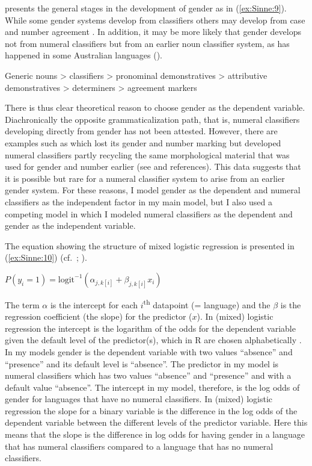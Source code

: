 \documentclass[output=collectionpaper]{langsci/langscibook}
\begin{document}
\citet[451]{Luraghi2011} presents the general stages in the development of gender as in (\ref{ex:Sinne:9}). While some gender systems develop from classifiers others may develop from case and number agreement \citep[452]{Luraghi2011}. In addition, it may be more likely that gender develops not from numeral classifiers but from an earlier noun classifier system, as has happened in some Australian languages (\citealt{Plaster2007}).

\ea
\label{ex:Sinne:9}
Generic nouns > classifiers > pronominal demonstratives > attributive demonstratives > determiners > agreement markers
\z

There is thus clear theoretical reason to choose gender as the dependent variable. Diachronically the opposite grammaticalization path, that is, numeral classifiers developing directly from gender has not been attested. However, there are examples such as  which lost its gender and number marking but developed numeral classifiers partly recycling the same morphological material that was used for gender and number earlier (see \citealt[379]{Aikhenvald2000} and references). This data suggests that it is possible but rare for a numeral classifier system to arise from an earlier gender system. For these reasons, I model gender as the dependent and numeral classifiers as the independent factor in my main model, but I also used a competing model in which I modeled numeral classifiers as the dependent and gender as the independent variable.

The equation showing the structure of mixed logistic regression is presented in (\ref{ex:Sinne:10}) (cf.\ \citealt[279]{Gelman2007}; \citealt[8]{Bentz2013}).

\ea
\label{ex:Sinne:10}
$P(y_{i}=1)={\text{logit}}^{-1}({\alpha} _{j,k[i]}+{\beta} _{j,k[i]}{x}_{i})$
\z

The term $\alpha$ is the intercept for each $i$\textsuperscript{th} datapoint (= language) and the $\beta$ is the regression coefficient (the slope) for the predictor ($x$). In (mixed) logistic regression the intercept is the logarithm of the odds for the dependent variable given the default level of the predictor(s), which in R are chosen alphabetically \citep[128]{Arppe2008}. In my models gender is the dependent variable with two values ``absence'' and ``presence'' and its default level is ``absence''. The predictor in my model is numeral classifiers which has two values ``absence'' and ``presence'' and with a default value ``absence''. The intercept in my model, therefore, is the log odds of gender for languages that have no numeral classifiers. In (mixed) logistic regression the slope for a binary variable is the difference in the log odds of the dependent variable between the different levels of the predictor variable. Here this means that the slope is the difference in log odds for having gender in a language that has numeral classifiers compared to a language that has no numeral classifiers.
\end{document}
